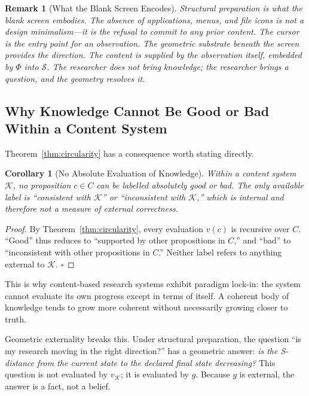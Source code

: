 \documentclass[11pt,twocolumn,a4paper]{article}
\newtheorem{corollary}[theorem]{Corollary}
\newtheorem{remark}[theorem]{Remark}
\begin{document}
\begin{remark}[What the Blank Screen Encodes]
Structural preparation is what the blank screen embodies. The absence of applications, menus, and file icons is not a design minimalism---it is the refusal to commit to any prior content. The cursor is the entry point for an observation. The geometric substrate beneath the screen provides the direction. The content is supplied by the observation itself, embedded by $\Phi$ into $\mathcal{S}$. The researcher does not bring knowledge; the researcher brings a question, and the geometry resolves it.
\end{remark}

\subsection{Why Knowledge Cannot Be Good or Bad Within a Content System}

Theorem~\ref{thm:circularity} has a consequence worth stating directly.

\begin{corollary}[No Absolute Evaluation of Knowledge]
\label{cor:no_absolute}
Within a content system $\mathcal{K}$, no proposition $c \in C$ can be labelled absolutely good or bad. The only available label is ``consistent with $\mathcal{K}$'' or ``inconsistent with $\mathcal{K}$,'' which is internal and therefore not a measure of external correctness.
\end{corollary}

\begin{proof}
By Theorem~\ref{thm:circularity}, every evaluation $v(c)$ is recursive over $C$. ``Good'' thus reduces to ``supported by other propositions in $C$,'' and ``bad'' to ``inconsistent with other propositions in $C$.'' Neither label refers to anything external to $\mathcal{K}$. $\square$
\end{proof}

This is why content-based research systems exhibit paradigm lock-in: the system cannot evaluate its own progress except in terms of itself. A coherent body of knowledge tends to grow more coherent without necessarily growing closer to truth.

Geometric externality breaks this. Under structural preparation, the question ``is my research moving in the right direction?'' has a geometric answer: \emph{is the S-distance from the current state to the declared final state decreasing?} This question is not evaluated by $v_\mathcal{K}$; it is evaluated by $g$. Because $g$ is external, the answer is a fact, not a belief.
\end{document}
